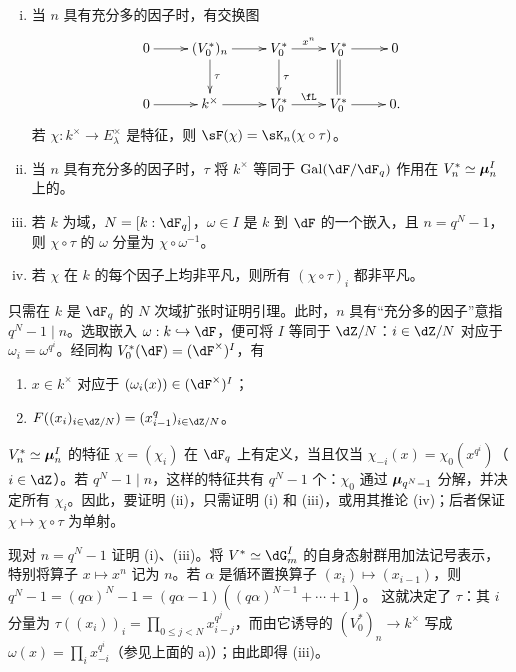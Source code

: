 \begin{lemma_}\label{VI:4-9}
\begin{enumerate}[(i)]
\item 当 $n$ 具有充分多的因子时，有交换图
\[\xymatrix{
0\ar[r]&(V_0^\ast)_n\ar[r]\ar[d]^-\tau&V_0^\ast\ar[r]^-{x^n}\ar[d]^-\tau&V_0^\ast\ar[r]\ar@{=}[d]&0\\
0\ar[r]&k^\times\ar[r]&V_0^\ast\ar[r]^-\fL&V_0^\ast\ar[r]&0.
}\]
若 $\chi:k^\times\to E_\lambda^\times$ 是特征，则 $\sF(\chi)=\sK_n(\chi\circ\tau)$。
\item 当 $n$ 具有充分多的因子时，$\tau$ 将 $k^\times$ 等同于 $\gal(\dF/\dF_q)$ 作用在 $V_n^\ast\simeq{\bm\mu}_n^I$ 上的。
\item 若 $k$ 为域，$N=[k:\dF_q]$，$\omega\in I$ 是 $k$ 到 $\dF$ 的一个嵌入，且 $n=q^N-1$，则 $\chi\circ\tau$ 的 $\omega$ 分量为 $\chi\circ\omega^{-1}$。
\item 若 $\chi$ 在 $k$ 的每个因子上均非平凡，则所有 $(\chi\circ\tau)_i$ 都非平凡。
\end{enumerate}
\end{lemma_}
只需在 $k$ 是 $\dF_q$ 的 $N$ 次域扩张时证明引理。此时，$n$ 具有“充分多的因子”意指 $q^N-1\mid n$。选取嵌入 $\omega:k\hookrightarrow\dF$，便可将 $I$ 等同于 $\dZ/N$：$i\in\dZ/N$ 对应于 $\omega_i=\omega^{q^i}$。经同构 $V_0^\ast(\dF)=(\dF^\times)^I$，有
\begin{enumerate}[\indent a)]
\item $x\in k^\times$ 对应于 $(\omega_i(x))\in(\dF^\times)^I$；
\item $F((x_i)_{i\in\dZ/N})=(x_{i-1}^q)_{i\in\dZ/N}$。
\end{enumerate}
$V_n^\ast\simeq{\bm\mu}_n^I$ 的特征 $\chi=(\chi_i)$ 在 $\dF_q$ 上有定义，当且仅当 $\chi_{-i}(x)=\chi_0(x^{q^i})$（$i\in\dZ$）。若 $q^N-1\mid n$，这样的特征共有 $q^N-1$ 个：$\chi_0$ 通过 ${\bm\mu}_{q^N-1}$ 分解，并决定所有 $\chi_i$。因此，要证明 (ii)，只需证明 (i) 和 (iii)，或用其推论 (iv)；后者保证 $\chi\mapsto\chi\circ\tau$ 为单射。

现对 $n=q^N-1$ 证明 (i)、(iii)。将 $V^\ast\simeq\dG_m^I$ 的自身态射群用加法记号表示，特别将算子 $x\mapsto x^n$ 记为 $n$。若 $\alpha$ 是循环置换算子 $(x_i)\mapsto(x_{i-1})$，则
$q^N-1=(q\alpha)^N-1=(q\alpha-1)((q\alpha)^{N-1}+\cdots+1)$。
这就决定了 $\tau$：其 $i$ 分量为
$\tau((x_i))_i=\prod_{0\le j<N}x_{i-j}^{q^j}$，而由它诱导的 $(V_0^\ast)_n\to k^\times$ 写成
$\omega(x)=\prod_i x_{-i}^{q^i}$（参见上面的 a)）；由此即得 (iii)。

